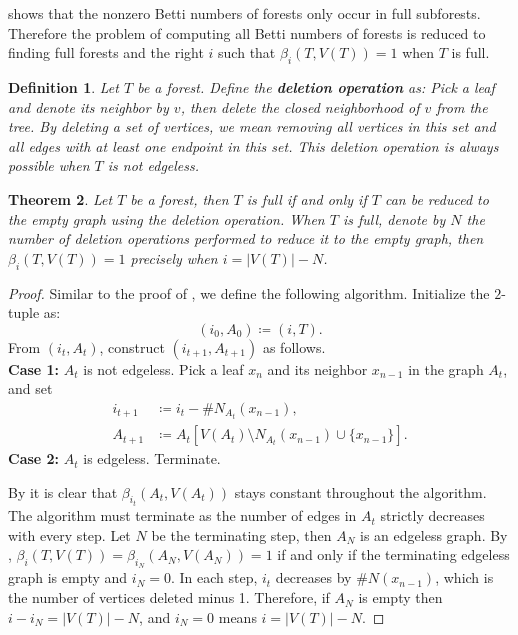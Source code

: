 \documentclass[dvipsnames,10pt]{article}
\newtheorem{theorem}{Theorem}[section]
\newtheorem{defi}[theorem]{Definition}
\begin{document}
 shows that the nonzero Betti numbers of forests only occur in full subforests. Therefore the problem of computing all Betti numbers of forests is reduced to finding full forests and the right $i$ such that $\beta_i(T,V(T))=1$ when $T$ is full.

\begin{defi}
    Let $T$ be a forest. Define the \textbf{deletion operation} as: Pick a leaf and denote its neighbor by $v$, then delete the closed neighborhood of $v$ from the tree. By deleting a set of vertices, we mean removing all vertices in this set and all edges with at least one endpoint in this set. This deletion operation is always possible when $T$ is not edgeless.
\end{defi}

\begin{theorem}
    Let $T$ be a forest, then $T$ is full if and only if $T$ can be reduced to the empty graph using the deletion operation. When $T$ is full, denote by $N$ the number of deletion operations performed to reduce it to the empty graph, then $\beta_i(T,V(T))=1$ precisely when $i=|V(T)|-N$.
\end{theorem}

\begin{proof}
    Similar to the proof of , we define the following algorithm. Initialize the $2$-tuple as:
    \begin{equation*}
        (i_0,A_0)\coloneq (i,T).
    \end{equation*}
    From $(i_t,A_t)$, construct $(i_{t+1},A_{t+1})$ as follows.\\
    \textbf{Case 1:} $A_t$ is not edgeless. Pick a leaf $x_n$ and its neighbor $x_{n-1}$ in the graph $A_t$, and set
    \begin{align*}
        i_{t+1}&\coloneq i_t-\#N_{A_t}(x_{n-1}),\\
        A_{t+1}&\coloneq A_t[V(A_t)\setminus N_{A_t}(x_{n-1})\cup\{x_{n-1}\}].
    \end{align*}
    \textbf{Case 2:} $A_t$ is edgeless. Terminate.

    By  it is clear that $\beta_{i_t}(A_t,V(A_t))$ stays constant throughout the algorithm. The algorithm must terminate as the number of edges in $A_t$ strictly decreases with every step. Let $N$ be the terminating step, then $A_N$ is an edgeless graph. By , $\beta_{i}(T,V(T))=\beta_{i_N}(A_N,V(A_N))=1$ if and only if the terminating edgeless graph is empty and $i_N=0$. In each step, $i_t$ decreases by $\# N(x_{n-1})$, which is the number of vertices deleted minus 1. Therefore, if $A_N$ is empty then $i-i_N=|V(T)|-N$, and $i_N=0$ means $i=|V(T)|-N$.
\end{proof}
\end{document}
